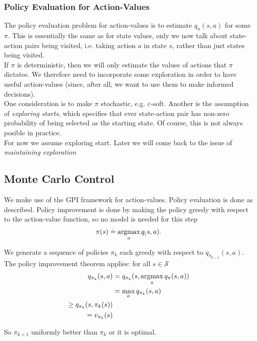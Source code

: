 \subsubsection*{Policy Evaluation for Action-Values}
The policy evaluation problem for action-values is to estimate $q_\pi(s, a)$ for some $\pi$. This is essentially the same as for state values, only we now talk about state-action pairs being visited, i.e. taking action $a$ in state $s$, rather than just states being visited.\\

If $\pi$ is deterministic, then we will only estimate the values of actions that $\pi$ dictates. We therefore need to incorporate some exploration in order to have useful action-values (since, after all, we want to use them to make informed decisions).\\

One consideration is to make $\pi$ stochastic, e.g. $\varepsilon$-soft. Another is the assumption of \emph{exploring starts}, which specifies that ever state-action pair has non-zero probability of being selected as the starting state. Of course, this is not always posible in practice.\\

For now we assume exploring start. Later we will come back to the issue of \emph{maintaining exploration}

\subsection{Monte Carlo Control}
We make use of the GPI framework for action-values. Policy evaluation is done as described. Policy improvement is done by making the policy greedy with respect to the action-value function, so no model is needed for this step
\[
    \pi(s) \doteq \operatorname*{argmax}_a q_(s, a).
\]

We generate a sequence of policies $\pi_k$ each greedy with respect to $q_{\pi_{k-1}}(s, a)$. The policy improvement theorem applies: for all $s \in \mathcal{S}$
\begin{align}
    q_{\pi_k}(s, a) &= q_{\pi_k}(s, \operatorname*{argmax}_a q_\pi(s, a)) \\
                    &= \max_a q_{\pi_k}(s, a) \\
                    \geq q_{\pi_k}(s, \pi_k(s))\\
                    = v_{\pi_k}(s)
\end{align}

So $\pi_{k+1}$ uniformly better than $\pi_k$ or it is optimal. \\

